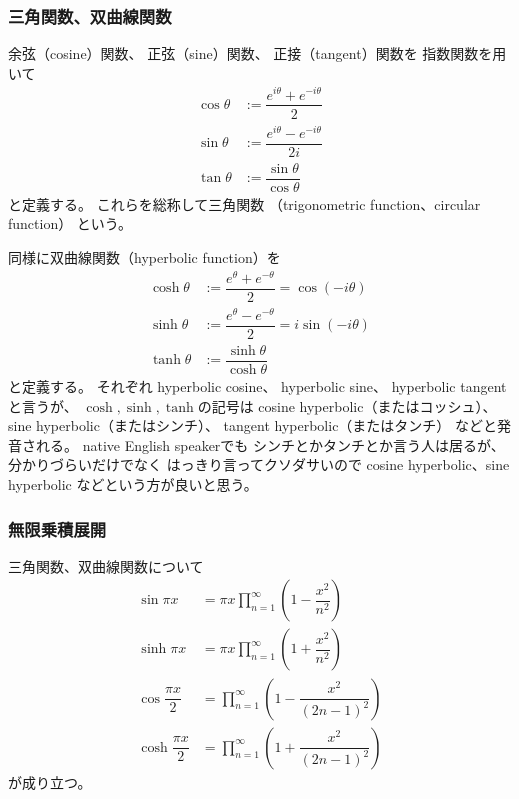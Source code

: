 \subsubsection{三角関数、双曲線関数}

余弦（cosine）関数、
正弦（sine）関数、
正接（tangent）関数を
指数関数を用いて
\begin{subequations}
\begin{align}
    \cos\theta &:= \dfrac{e^{i\theta} + e^{-i\theta}}{2}
\\
    \sin\theta &:= \dfrac{e^{i\theta} - e^{-i\theta}}{2i}
\\
    \tan\theta &:= \dfrac{\sin\theta}{\cos\theta}
\end{align}
\end{subequations}
と定義する。
これらを総称して三角関数
（trigonometric function、circular function）
という。

同様に双曲線関数（hyperbolic function）を
\begin{subequations}
\begin{align}
    \cosh\theta
    &:=
    \dfrac{e^{\theta} + e^{-\theta}}{2}
    =
    \cos(-i\theta)
\\
    \sinh\theta
    &:=
    \dfrac{e^{\theta} - e^{-\theta}}{2}
    =
    i\sin(-i\theta)
\\
    \tanh\theta
    &:=
    \dfrac{\sinh\theta}{\cosh\theta}
\end{align}
\end{subequations}
と定義する。
それぞれ
hyperbolic cosine、
hyperbolic sine、
hyperbolic tangentと言うが、
$\cosh, \sinh, \tanh$の記号は
cosine hyperbolic（またはコッシュ）、
sine hyperbolic（またはシンチ）、
tangent hyperbolic（またはタンチ）
などと発音される。
native English speakerでも
シンチとかタンチとか言う人は居るが、
分かりづらいだけでなく
はっきり言ってクソダサいので
cosine hyperbolic、sine hyperbolic
などという方が良いと思う。

\subsubsection{無限乗積展開}

三角関数、双曲線関数について
\begin{subequations}
\begin{align}
    \sin \pi x
    &=
    \pi x
    \prod_{n=1}^\infty
    \left(
        1 - \dfrac{x^2}{n^2}
    \right)
\label{infinite product of sine}
\\
    \sinh \pi x
    &=
    \pi x
    \prod_{n=1}^\infty
    \left(
        1 + \dfrac{x^2}{n^2}
    \right)
\label{infinite product of sine hyperbolic}
\\
    \cos \dfrac{\pi x}{2}
    &=
    \prod_{n=1}^\infty
    \left(
        1 - \dfrac{x^2}{(2n-1)^2}
    \right)
\\
    \cosh \dfrac{\pi x}{2}
    &=
    \prod_{n=1}^\infty
    \left(
        1 + \dfrac{x^2}{(2n-1)^2}
    \right)
\end{align}
\end{subequations}
が成り立つ。

